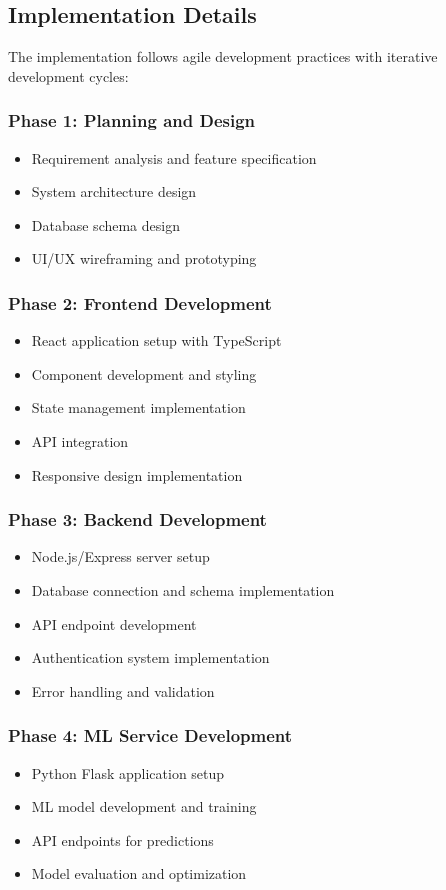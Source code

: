 \documentclass[12pt,a4paper]{article}
\begin{document}
\subsection{Implementation Details}

The implementation follows agile development practices with iterative development cycles:

\subsubsection{Phase 1: Planning and Design}
\begin{itemize}
    \item Requirement analysis and feature specification
    \item System architecture design
    \item Database schema design
    \item UI/UX wireframing and prototyping
\end{itemize}

\subsubsection{Phase 2: Frontend Development}
\begin{itemize}
    \item React application setup with TypeScript
    \item Component development and styling
    \item State management implementation
    \item API integration
    \item Responsive design implementation
\end{itemize}

\subsubsection{Phase 3: Backend Development}
\begin{itemize}
    \item Node.js/Express server setup
    \item Database connection and schema implementation
    \item API endpoint development
    \item Authentication system implementation
    \item Error handling and validation
\end{itemize}

\subsubsection{Phase 4: ML Service Development}
\begin{itemize}
    \item Python Flask application setup
    \item ML model development and training
    \item API endpoints for predictions
    \item Model evaluation and optimization
\end{itemize}
\end{document}
